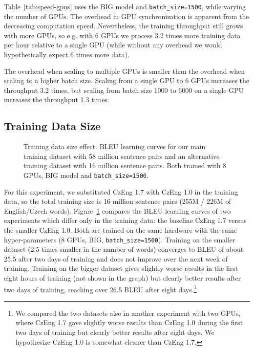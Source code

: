 \documentclass{pbmlarxiv} \pdfoutput=1
\def\Tref#1{Table~\ref{#1}}
\begin{document}
\Tref{tab:speed-gpus} uses the BIG model and \texttt{batch\_size=1500},
 while varying the number of GPUs.
The overhead in GPU synchronization is apparent from the decreasing computation speed.
Nevertheless, the training throughput still grows with more GPUs,
 so e.g. with 6 GPUs we process 3.2 times more training data per hour relative to a single GPU
 (while without any overhead we would hypothetically expect 6 times more data).

The overhead when scaling to multiple GPUs is smaller
 than the overhead when scaling to a higher batch size.
Scaling from a single GPU to 6 GPUs increases the throughput 3.2 times,
 but scaling from batch size 1000 to 6000 on a single GPU increases the throughput 1.3 times.

\subsection{Training Data Size}
\label{sec:train-data-size}

\begin{figure}
\vspace{-5mm}
\cprotect\caption{Training data size effect.
 BLEU learning curves for our main training dataset with 58 million sentence pairs
 and an alternative training dataset with 16 million sentence pairs.
 Both trained with 8 GPUs, BIG model and \verb|batch_size=1500|.
}
\label{fig:czeng1-vs-czeng57}
\end{figure}

For this experiment, we substituted CzEng 1.7 with CzEng 1.0 in the training data,
 so the total training size is 16 million sentence pairs (255M / 226M of English/Czech words).
Figure~\ref{fig:czeng1-vs-czeng57} compares the BLEU learning curves of two experiments
 which differ only in the training data: the baseline CzEng 1.7 versus the smaller CzEng 1.0.
Both are trained on the same hardware with the same hyper-parameters
 (8 GPUs, BIG, \verb|batch_size=1500|).
Training on the smaller dataset (2.5 times smaller in the number of words) converges
 to BLEU of about 25.5 after two days of training and does not improve over the next week of training.
Training on the bigger dataset gives slightly worse results
 in the first eight hours of training (not shown in the graph)
 but clearly better results after two days of training,
 reaching over 26.5 BLEU after eight days.\footnote{
  We compared the two datasets also in another experiment with two GPUs,
   where CzEng 1.7 gave slightly worse results than CzEng 1.0 during the first two days of training
   but clearly better results after eight days.
  We hypothesize CzEng 1.0 is somewhat cleaner than CzEng 1.7.
 }
\end{document}
